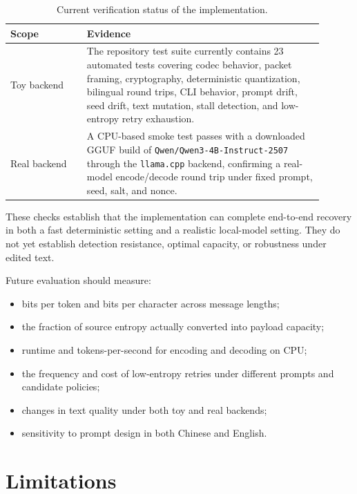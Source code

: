 \documentclass[sigconf,review,anonymous]{acmart}
\begin{document}
\begin{table}[t]
    \centering
    \caption{Current verification status of the implementation.}
    \label{tab:verification}
    \begin{tabular}{p{0.22\linewidth}p{0.68\linewidth}}
        \toprule
        Scope & Evidence \\
        \midrule
        Toy backend & The repository test suite currently contains 23 automated tests covering codec behavior, packet framing, cryptography, deterministic quantization, bilingual round trips, CLI behavior, prompt drift, seed drift, text mutation, stall detection, and low-entropy retry exhaustion. \\
        Real backend & A CPU-based smoke test passes with a downloaded GGUF build of \texttt{Qwen/Qwen3-4B-Instruct-2507} through the \texttt{llama.cpp} backend, confirming a real-model encode/decode round trip under fixed prompt, seed, salt, and nonce. \\
        \bottomrule
    \end{tabular}
\end{table}

These checks establish that the implementation can complete end-to-end recovery in both a fast deterministic setting and a realistic local-model setting. They do not yet establish detection resistance, optimal capacity, or robustness under edited text.

Future evaluation should measure:

\begin{itemize}
    \item bits per token and bits per character across message lengths;
    \item the fraction of source entropy actually converted into payload capacity;
    \item runtime and tokens-per-second for encoding and decoding on CPU;
    \item the frequency and cost of low-entropy retries under different prompts and candidate policies;
    \item changes in text quality under both toy and real backends;
    \item sensitivity to prompt design in both Chinese and English.
\end{itemize}

\section{Limitations}
\end{document}
